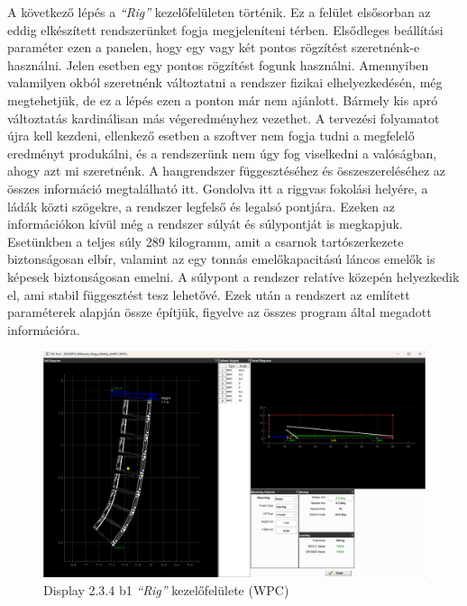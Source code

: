 A következő lépés a \textit{``Rig''} kezelőfelületen történik. Ez a felület elsősorban az eddig elkészített
rendszerünket fogja megjeleníteni térben. Elsődleges beállítási paraméter ezen a panelen, hogy egy vagy két pontos
rögzítést szeretnénk-e használni. Jelen esetben egy pontos  rögzítést fogunk használni. Amennyiben valamilyen okból
szeretnénk változtatni a rendszer fizikai elhelyezkedésén, még megtehetjük, de ez a lépés ezen a ponton már nem ajánlott.
Bármely kis apró változtatás kardinálisan más végeredményhez vezethet. A tervezési folyamatot újra kell kezdeni, ellenkező esetben
a szoftver nem fogja tudni a megfelelő eredményt produkálni, és a rendszerünk nem úgy fog viselkedni a valóságban, ahogy azt mi szeretnénk.
A hangrendszer függesztéséhez és összeszereléséhez az összes információ megtalálható itt. Gondolva itt a riggvas fokolási helyére,
a ládák közti szögekre, a rendszer legfelső és legalsó pontjára.
Ezeken az információkon kívül még a rendszer súlyát és súlypontját is megkapjuk.
Esetünkben a teljes súly 289 kilogramm, amit a csarnok tartószerkezete biztonságosan elbír, valamint az egy tonnás emelőkapacitású
láncos emelők is képesek biztonságosan emelni. A súlypont a rendszer relatíve közepén helyezkedik el, ami stabil függesztést tesz lehetővé.
Ezek után a rendszert az említett paraméterek alapján össze építjük, figyelve az összes program által megadott információra.
\begin{figure}[H]
	\centering
	\includegraphics[width=\textwidth, keepaspectratio]{figures/display_wpc_4.png}
	\caption{Display 2.3.4 b1 \textit{``Rig''} kezelőfelülete (WPC)}\label{fig:display_wpc_4}
\end{figure}
